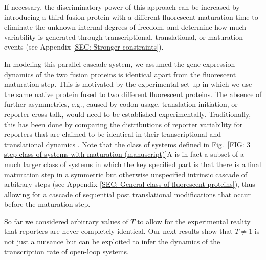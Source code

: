 \documentclass[%
 reprint,prx,
superscriptaddress,
%
%
%
%
%
%
%
%
%
 amsmath,amssymb,
 aps,
%
%
%
%
%
%
]{revtex4-2}
\begin{document}
If necessary, the discriminatory power of this approach can be increased by introducing a third fusion protein with a different fluorescent maturation time to eliminate the unknown internal degrees of freedom, and determine how much variability is generated through transcriptional, translational, or maturation events (see Appendix \ref{SEC: Stronger constraints}).

In modeling this parallel cascade system, we assumed the gene expression dynamics of the two fusion proteins is identical apart from the fluorescent maturation step. This is motivated by the experimental set-up in which we use the same native protein fused to two different fluorescent proteins. {The absence of further asymmetries, e.g., caused by codon usage, translation initiation, or reporter cross talk, would need to be established experimentally. Traditionally, this has been done by comparing the distributions of reporter variability for reporters that are claimed to be identical in their transcriptional and translational dynamics \cite{Raser2004, Bar-Even2006, Elowitz2002, baudrimont2019contribution}.  Note that the class of systems defined in Fig.~\ref{FIG: 3 step class of systems with maturation (manuscript)}A is in fact a subset of a much larger class of systems in which the key specified part is that there is a final maturation step in a symmetric but otherwise unspecified intrinsic cascade of arbitrary steps (see Appendix \ref{SEC: General class of fluorescent proteins}), thus allowing for a cascade of sequential post translational modifications that occur before the maturation step.}

{So far we considered arbitrary values of $T$ to allow for the experimental reality that reporters are never completely identical. Our next results show that $T\neq1$ is not just a nuisance but can be exploited to infer the dynamics of the transcription rate of open-loop systems.}
\end{document}
